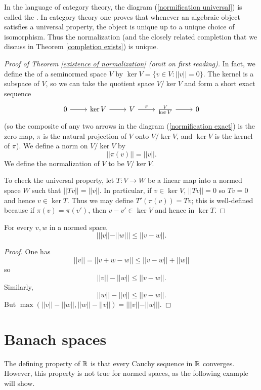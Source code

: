 \begin{subsec}
In the language of category theory, the diagram (\ref{normification universal}) is called the .
In category theory one proves that whenever an algebraic object satisfies a universal property, the object is unique up to a unique choice of isomorphism.
Thus the normalization (and the closely related completion that we discuss in Theorem \ref{completion exists}) is unique.
\end{subsec}

\begin{proof}[Proof of Theorem \ref{existence of normalization} (omit on first reading)]
In fact, we define the  of a seminormed space $V$ by $\ker V = \{v \in V: ||v|| = 0\}$.
The kernel is a subspace of $V$, so we can take the quotient space $V/\ker V$ and form a short exact sequence
\begin{equation}
\label{normification exact}
\begin{tikzcd}
0 \arrow[r] & \ker V \arrow[r] & V \arrow[r,"\pi"] & \frac{V}{\ker V} \arrow[r] & 0
\end{tikzcd}
\end{equation}
(so the composite of any two arrows in the diagram (\ref{normification exact}) is the zero map, $\pi$ is the natural projection of $V$ onto $V/\ker V$, and $\ker V$ is the kernel of $\pi$).
We define a norm on $V/\ker V$ by
\[||\pi(v)|| = ||v||.\]
We define the normalization of $V$ to be $V/\ker V$.

To check the universal property, let $T: V \to W$ be a linear map into a normed space $W$ such that $||Tv|| = ||v||$.
In particular, if $v \in \ker V$, $||Tv|| = 0$ so $Tv = 0$ and hence $v \in \ker T$.
Thus we may define $T'(\pi(v)) = Tv$; this is well-defined because if $\pi(v) = \pi(v')$, then $v - v' \in \ker V$ and hence in $\ker T$.
\end{proof}

\begin{lemma}
For every $v, w$ in a normed space,
\[|||v|| - ||w||| \leq ||v - w||.\]
\end{lemma}
\begin{proof}
One has
\[||v|| = ||v + w - w|| \leq ||v - w|| + ||w||\]
so
\[||v|| - ||w|| \leq ||v - w||.\]
Similarly,
\[||w|| - ||v|| \leq ||v - w||.\]
But $\max(||v|| - ||w||, ||w|| - ||v||) = |||v|| - ||w|||$.
\end{proof}

\section{Banach spaces}
\label{Banach space appendix}
The defining property of $\mathbb{R}$ is that every Cauchy sequence in $\mathbb{R}$ converges.
However, this property is not true for normed spaces, as the following example will show.

